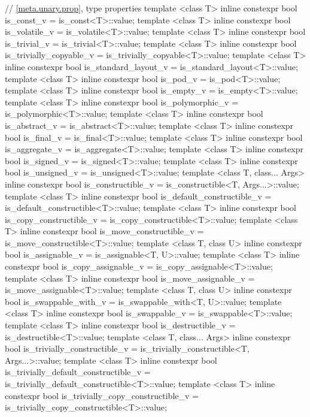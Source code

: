 \begin{codeblock}
{  // \ref{meta.unary.prop}, type properties
  template <class T> inline constexpr bool is_const_v
    = is_const<T>::value;
  template <class T> inline constexpr bool is_volatile_v
    = is_volatile<T>::value;
  template <class T> inline constexpr bool is_trivial_v
    = is_trivial<T>::value;
  template <class T> inline constexpr bool is_trivially_copyable_v
    = is_trivially_copyable<T>::value;
  template <class T> inline constexpr bool is_standard_layout_v
    = is_standard_layout<T>::value;
  template <class T> inline constexpr bool is_pod_v
    = is_pod<T>::value;
  template <class T> inline constexpr bool is_empty_v
    = is_empty<T>::value;
  template <class T> inline constexpr bool is_polymorphic_v
    = is_polymorphic<T>::value;
  template <class T> inline constexpr bool is_abstract_v
    = is_abstract<T>::value;
  template <class T> inline constexpr bool is_final_v
    = is_final<T>::value;
  template <class T> inline constexpr bool is_aggregate_v
    = is_aggregate<T>::value;
  template <class T> inline constexpr bool is_signed_v
    = is_signed<T>::value;
  template <class T> inline constexpr bool is_unsigned_v
    = is_unsigned<T>::value;
  template <class T, class... Args> inline constexpr bool is_constructible_v
    = is_constructible<T, Args...>::value;
  template <class T> inline constexpr bool is_default_constructible_v
    = is_default_constructible<T>::value;
  template <class T> inline constexpr bool is_copy_constructible_v
    = is_copy_constructible<T>::value;
  template <class T> inline constexpr bool is_move_constructible_v
    = is_move_constructible<T>::value;
  template <class T, class U> inline constexpr bool is_assignable_v
    = is_assignable<T, U>::value;
  template <class T> inline constexpr bool is_copy_assignable_v
    = is_copy_assignable<T>::value;
  template <class T> inline constexpr bool is_move_assignable_v
    = is_move_assignable<T>::value;
  template <class T, class U> inline constexpr bool is_swappable_with_v
    = is_swappable_with<T, U>::value;
  template <class T> inline constexpr bool is_swappable_v
    = is_swappable<T>::value;
  template <class T> inline constexpr bool is_destructible_v
    = is_destructible<T>::value;
  template <class T, class... Args> inline constexpr bool is_trivially_constructible_v
    = is_trivially_constructible<T, Args...>::value;
  template <class T> inline constexpr bool is_trivially_default_constructible_v
    = is_trivially_default_constructible<T>::value;
  template <class T> inline constexpr bool is_trivially_copy_constructible_v
    = is_trivially_copy_constructible<T>::value;
}
\end{codeblock}
